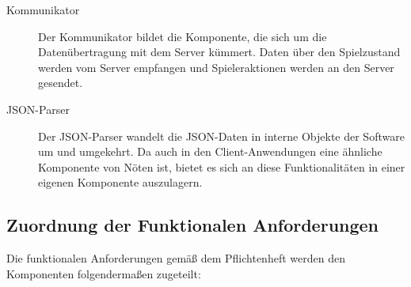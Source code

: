 \begin{description}
			\item[Kommunikator]
			Der Kommunikator bildet die Komponente, die sich um die Datenübertragung mit dem Server kümmert. Daten über den Spielzustand werden vom Server empfangen und Spieleraktionen werden an den Server gesendet.
			
			\item[JSON-Parser]
			Der JSON-Parser wandelt die JSON-Daten in interne Objekte der Software um und umgekehrt. Da auch in den Client-Anwendungen eine ähnliche Komponente von Nöten ist, bietet es sich an diese Funktionalitäten in einer eigenen Komponente auszulagern.  

		\end{description}
		
	\subsection{Zuordnung der Funktionalen Anforderungen}
	
	Die funktionalen Anforderungen gemäß dem Pflichtenheft werden den Komponenten folgendermaßen zugeteilt:
	
